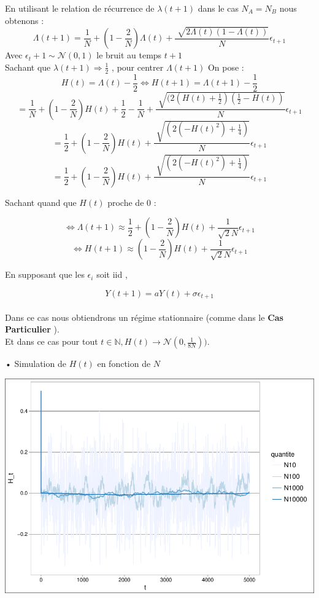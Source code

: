 \documentclass[11pt,]{article}
\begin{document}
En utilisant le relation de récurrence de \(\lambda(t+1)\) dans le cas
\(N_A=N_B\) nous obtenons :\\
\[\Lambda(t+1)=\frac{1}{N} + (1-\frac{2}{N})\Lambda(t)+\frac{\sqrt[]{2\Lambda(t)(1-\Lambda(t))}}{N}\epsilon_{t+1}\]
Avec \(\epsilon_t+1 \sim \mathcal{N}(0,1)\) le bruit au temps \(t+1\)\\
Sachant que \(\lambda(t+1) \Rightarrow \frac{1}{2}\) , pour centrer
\(\Lambda(t+1)\) On pose : \[H(t)=\Lambda(t)-\frac{1}{2}
\Longleftrightarrow H(t+1)=\Lambda(t+1)-\frac{1}{2}\]
\[=\frac{1}{N} +(1-\frac{2}{N})H(t) +\frac{1}{2} -\frac{1}{N} +\frac{\sqrt[]{(2(H(t)+\frac{1}{2})(\frac{1}{2}-H(t))} }{N}\epsilon_{t+1}\]
\[=\frac{1}{2}+ (1-\frac{2}{N})H(t)   +\frac{\sqrt[]{(2(-H(t)^2)+\frac{1}{4}) }}{N}\epsilon_{t+1}\]
\[=\frac{1}{2}+ (1-\frac{2}{N})H(t)   +\frac{\sqrt[]{(2(-H(t)^2)+\frac{1}{4}) }}{N}\epsilon_{t+1}\]

Sachant quand que \(H(t)\) proche de \(0\) :

\[\Longleftrightarrow \Lambda(t+1) \approx \frac{1}{2}+(1-\frac{2}{N})H(t)+\frac{1}{\sqrt{2}N}\epsilon_{t+1}\]
\[ \Longleftrightarrow H(t+1) \approx (1-\frac{2}{N})H(t) +\frac{1}{\sqrt{2}N}\epsilon_{t+1}  \]

En supposant que les \(\epsilon_i\) soit iid ,

\[Y(t+1)=aY(t)+\sigma \epsilon_{t+1}\]\\
Dans ce cas nous obtiendrons un régime stationnaire (comme dans le
\textbf{Cas Particulier} ).\\
Et dans ce cas pour tout
\(t \in \mathbb{N}, H(t) \rightarrow \mathcal{N}(0,\frac{1}{8N}))\).

• Simulation de \(H(t)\) en fonction de \(N\)

\includegraphics{money_exchange_files/figure-latex/unnamed-chunk-9-1.pdf}
\end{document}
